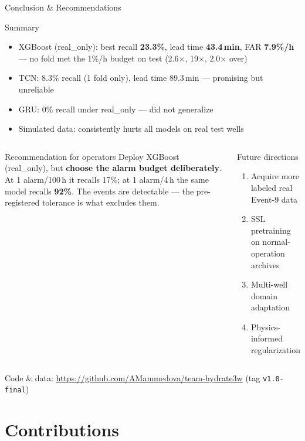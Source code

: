 \documentclass[aspectratio=169,10pt]{beamer}
\begin{document}
\begin{frame}{Conclusion \& Recommendations}
  \begin{block}{Summary}
    \begin{itemize}
      \item XGBoost (real\_only): best recall \textbf{23.3\%}, lead time \textbf{43.4\,min}, FAR \textbf{7.9\%/h} --- no fold met the 1\%/h budget on test (2.6$\times$, 19$\times$, 2.0$\times$ over)
      \item TCN: 8.3\% recall (1 fold only), lead time 89.3\,min — promising but unreliable
      \item GRU: 0\% recall under real\_only — did not generalize
      \item Simulated data: consistently hurts all models on real test wells
    \end{itemize}
  \end{block}
  \begin{columns}
      \begin{exampleblock}{Recommendation for operators}
        Deploy XGBoost (real\_only), but \textbf{choose the alarm budget deliberately}. At 1 alarm/100\,h it recalls 17\%; at 1 alarm/4\,h the same model recalls \textbf{92\%}. The events are detectable --- the pre-registered tolerance is what excludes them.
      \end{exampleblock}
      \begin{block}{Future directions}
        \begin{enumerate}
          \item Acquire more labeled real Event-9 data
          \item SSL pretraining on normal-operation archives
          \item Multi-well domain adaptation
          \item Physics-informed regularization
        \end{enumerate}
      \end{block}
  \end{columns}
  \vspace{0.4em}
  \small Code \& data: \url{https://github.com/AMammedova/team-hydrate3w} (tag \texttt{v1.0-final})
\end{frame}

\section*{Contributions}
\end{document}
